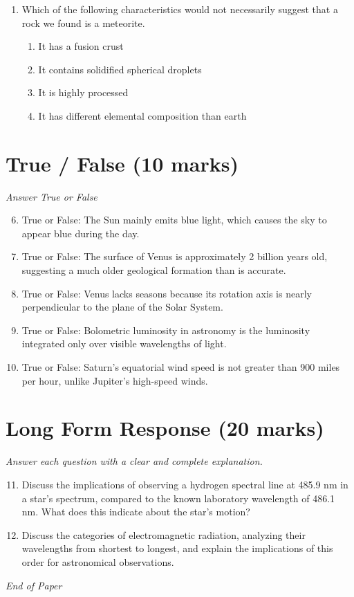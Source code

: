 \documentclass[12pt]{article}
\begin{document}
\begin{enumerate}[label=\arabic*.]
\begin{enumerate}[label=(\alph*)]
    \item Because the atmosphere preferentially scatters short wavelengths.
    \item Because the Earth's atmosphere preferentially absorbs all other colors.
\end{enumerate}
\item Which of the following characteristics would not necessarily suggest that a rock we found
is a meteorite.
\begin{enumerate}[label=(\alph*)]
    \item It has a fusion crust
    \item It contains solidified spherical droplets
    \item It is highly processed
    \item It has different elemental composition than earth
\end{enumerate}
\end{enumerate}

\section*{True / False (10 marks)}
\textit{Answer True or False}
\begin{enumerate}[label=\arabic*.]
\setcounter{enumi}{5}
\item True or False: The Sun mainly emits blue light, which causes the sky to appear blue during the day.
\item True or False: The surface of Venus is approximately 2 billion years old, suggesting a much older geological formation than is accurate.
\item True or False: Venus lacks seasons because its rotation axis is nearly perpendicular to the plane of the Solar System.
\item True or False: Bolometric luminosity in astronomy is the luminosity integrated only over visible wavelengths of light.
\item True or False: Saturn's equatorial wind speed is not greater than 900 miles per hour, unlike Jupiter's high-speed winds.
\end{enumerate}

\section*{Long Form Response (20 marks)}
\textit{Answer each question with a clear and complete explanation.}
\begin{enumerate}[label=\arabic*.]
\setcounter{enumi}{10}
\item Discuss the implications of observing a hydrogen spectral line at 485.9 nm in a star's
spectrum, compared to the known laboratory wavelength of 486.1 nm. What does this indicate
about the star's motion?
\item Discuss the categories of electromagnetic radiation, analyzing their wavelengths from
shortest to longest, and explain the implications of this order for astronomical
observations.
\end{enumerate}

\vfill
\noindent\textit{End of Paper}
\end{document}
